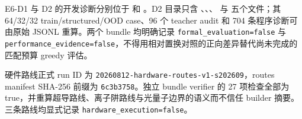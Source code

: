 \documentclass[UTF8,fontset=fandol,11pt]{ctexart}
\begin{document}
E6-D1 与 D2 的开发诊断分别位于  和 。D2 目录只含 、、、 与  五个文件；其 64/32/32 train/structured/OOD case、96 个 teacher audit 和 704 条程序诊断可由原始 JSONL 重算。两个 bundle 均明确记录 \texttt{formal\_evaluation=false} 与 \texttt{performance\_evidence=false}，不得用相对置换对照的正向差异替代尚未完成的匹配预算 greedy 评估。

硬件路线正式 run ID 为 \texttt{20260812-hardware-routes-v1-s202609}，routes manifest SHA-256 前缀为 \texttt{6c3b3758}。独立 bundle verifier 的 27 项检查全部为 true，并重算超导路线、离子阱路线与光量子边界的语义而不信任 builder 摘要。三条路线均显式记录 \texttt{hardware\_execution=false}。
\end{document}
